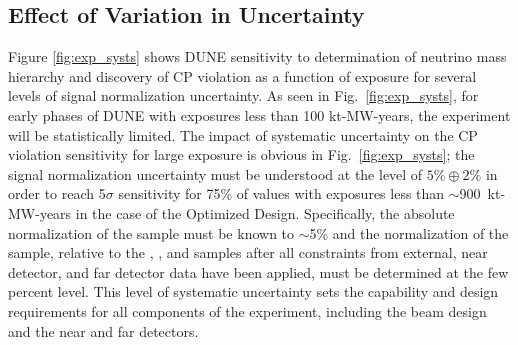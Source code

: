 \subsection{Effect of Variation in Uncertainty}
Figure \ref{fig:exp_systs} shows DUNE sensitivity to determination of
neutrino mass hierarchy and discovery of CP violation
as a function of exposure for several levels of signal normalization uncertainty.
As seen in Fig.~\ref{fig:exp_systs}, for early phases of DUNE
with exposures less than 100 kt-MW-years, the experiment
will be statistically limited.
The impact of systematic uncertainty on the CP violation sensitivity for large exposure
is obvious in Fig.~\ref{fig:exp_systs}; the \nue signal normalization uncertainty must
be understood at the level of $5\% \oplus 2\%$ in order to reach 5$\sigma$ sensitivity for
75\% of \deltacp values with exposures less than $\sim$900~kt-MW-years in the case of the
Optimized Design. Specifically, the absolute normalization of the \numu sample must be known to
$\sim$5\% and the normalization of the \nue sample,
relative to the \anue, \numu, and \anumu samples after all constraints from
external, near detector, and far detector data have been applied, must be determined 
at the few percent level. This level of systematic uncertainty sets the capability and
design requirements for all components of the experiment, including the beam design and the
near and far detectors.
%
